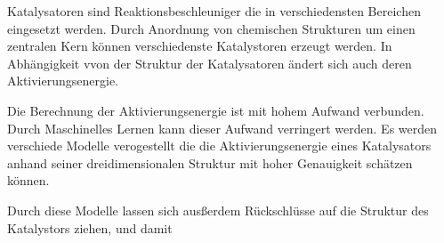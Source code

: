 
\Abstract

Katalysatoren sind Reaktionsbeschleuniger die in verschiedensten Bereichen eingesetzt werden.
Durch Anordnung von chemischen Strukturen um einen zentralen Kern können verschiedenste Katalystoren erzeugt werden.
In Abhängigkeit vvon der Struktur der Katalysatoren ändert sich auch deren Aktivierungsenergie.

Die Berechnung der Aktivierungsenergie ist mit hohem Aufwand verbunden.
Durch Maschinelles Lernen kann dieser Aufwand verringert werden.
Es werden verschiede Modelle verogestellt die die Aktivierungsenergie eines Katalysators 
anhand seiner dreidimensionalen Struktur mit hoher Genauigkeit schätzen können.

Durch diese Modelle lassen sich ausßerdem Rückschlüsse auf die Struktur des Katalystors ziehen,
und damit 